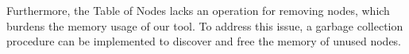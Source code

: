 Furthermore, the Table of Nodes lacks an operation for removing nodes, which burdens the memory usage of our tool. To address this issue, a garbage collection procedure can be implemented to discover and free the memory of unused nodes.



